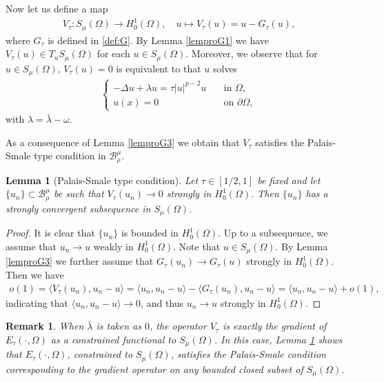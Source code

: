 \documentclass[10pt,a4paper]{article}
\newtheorem{lemma}[theorem]{Lemma}
\newtheorem{remark}[theorem]{Remark}
\theoremstyle{definition} \theoremstyle{remark}
\numberwithin{equation}{section}
\newcommand{\B}{\mathcal{B}}
\newcommand{\la}{\lambda}
\begin{document}
Now let us define a map
\begin{align} \label{def:V}
	V_\tau: S_\mu(\Omega) \to H_0^1(\Omega), \quad u \mapsto V_\tau(u) = u - G_\tau(u),
\end{align}
where $G_\tau$ is defined in \eqref{def:G}. By Lemma \ref{lemproG1} we have $V_\tau(u) \in T_uS_\mu(\Omega)$ for each $u \in S_\mu(\Omega)$. Moreover, we observe that for $u \in S_\mu(\Omega)$, $V_\tau(u) = 0$ is equivalent to that $u$ solves
	 \begin{align} \label{eqequationomegatau}
	 	\begin{cases}
	 		-\Delta u + \la u = \tau|u|^{p-2}u & \quad \text{in } \Omega, \\
	 		u(x) = 0 & \quad \text{on } \partial \Omega,
	 	\end{cases}
	 \end{align}
with $\la = \bar\la - \omega$.

\vskip0.1in

As a consequence of Lemma \ref{lemproG3} we obtain that $V_\tau$ satisfies the Palais-Smale type condition in $\B_\rho^\mu$.

\begin{lemma}[Palais-Smale type condition] \label{lempscondition}
	Let $\tau \in [1/2,1]$ be fixed and let $\{u_n\} \subset \B_\rho^\mu$ be such that $V_\tau(u_n) \to 0$ strongly in $H_0^1(\Omega)$. Then $\{u_n\}$ has a strongly convergent subsequence in $S_\mu(\Omega)$.
\end{lemma}

\begin{proof}
	It is clear that $\{u_n\}$ is bounded in $H_0^1(\Omega)$. Up to a subsequence, we assume that $u_n \to u$ weakly in $H_0^1(\Omega)$. Note that $u \in S_\mu(\Omega)$. By Lemma \ref{lemproG3} we further assume that $G_\tau(u_n) \to G_\tau(u)$ strongly in $H_0^1(\Omega)$. Then we have
	\begin{align*}
		o(1) = \langle V_\tau(u_n),u_n-u \rangle = \langle u_n,u_n-u \rangle - \langle G_\tau(u_n),u_n-u \rangle = \langle u_n,u_n-u \rangle + o(1),
	\end{align*}
	indicating that $\langle u_n,u_n-u \rangle \to 0$, and thus $u_n \to u$ strongly in $H_0^1(\Omega)$.
\end{proof}

\begin{remark}
	When $\bar\la$ is taken as $0$, the operator $V_\tau$ is exactly the gradient of $E_\tau(\cdot,\Omega)$ as a constrained functional to $S_\mu(\Omega)$. In this case, Lemma \ref{lempscondition} shows that $E_\tau(\cdot,\Omega)$, constrained to $S_\mu(\Omega)$, satisfies the Palais-Smale condition corresponding to the gradient operator on any bounded closed subset of $S_\mu(\Omega)$.
\end{remark}
\end{document}
